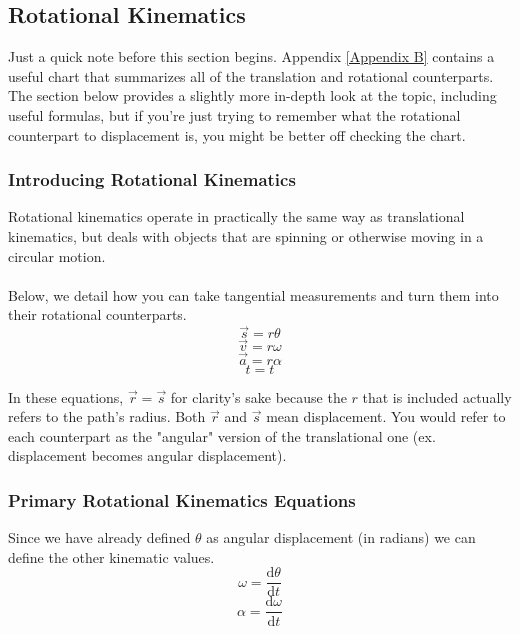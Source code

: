 \documentclass{article}
\begin{document}
\subsection{Rotational Kinematics}

Just a quick note before this section begins. Appendix \ref{Appendix B} contains a useful chart that summarizes all of the translation and rotational counterparts. The section below provides a slightly more in-depth look at the topic, including useful formulas, but if you're just trying to remember what the rotational counterpart to displacement is, you might be better off checking the chart.
\newpage
\subsubsection{Introducing Rotational Kinematics} \label{trans to ang}
Rotational kinematics operate in practically the same way as translational kinematics, but deals with objects that are spinning or otherwise moving in a circular motion. \\ \\
Below, we detail how you can take tangential measurements and turn them into their rotational counterparts. \\
\[ \vec{s} = r \theta \]
\[ \vec{v} = r \omega \]
\[ \vec{a} = r \alpha \]
\[ t = t \]

\noindent In these equations, $\vec{r} = \vec{s}$ for clarity's sake because the $r$ that is included actually refers to the path's radius. Both $\vec{r}$ and $\vec{s}$ mean displacement. You would refer to each counterpart as the "angular" version of the translational one (ex. displacement becomes angular displacement).

\subsubsection{Primary Rotational Kinematics Equations}
Since we have already defined $\theta$ as angular displacement (in radians) we can define the other kinematic values.
\begin{equation}
    \omega = \frac{\mathrm{d}\theta}{\mathrm{d}t}
\end{equation}
\begin{equation}
    \alpha = \frac{\mathrm{d}\omega}{\mathrm{d}t}
\end{equation}
\end{document}
